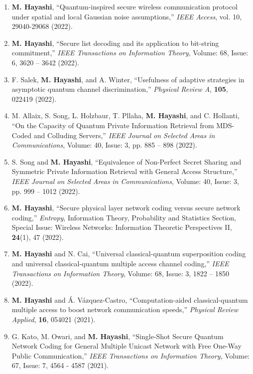 \documentclass[a4paper,12pt,oneside]{article}
\begin{document}
\begin{enumerate}
\item
\textbf{M. Hayashi},
``Quantum-inspired secure wireless communication protocol under spatial and local Gaussian noise assumptions,''
{\em IEEE Access},
vol. 10, 29040-29068 (2022).

\item
\textbf{M. Hayashi},
``Secure list decoding and its application to bit-string commitment,''
{\em IEEE Transactions on Information Theory},
Volume: 68, Issue: 6, 3620 – 3642 (2022).

\item
F. Salek, \textbf{M. Hayashi}, and A. Winter,
``Usefulness of adaptive strategies in asymptotic quantum channel discrimination,''
{\em Physical Review A},
{\bf 105}, 022419 (2022).

\item
M. Allaix, S. Song, L. Holzbaur, T. Pllaha, \textbf{M. Hayashi}, and C. Hollanti,
``On the Capacity of Quantum Private Information Retrieval from MDS-Coded and Colluding Servers,''
{\em IEEE Journal on Selected Areas in Communications},
Volume: 40, Issue: 3, pp. 885 – 898 (2022).

\item
S. Song and \textbf{M. Hayashi},
``Equivalence of Non-Perfect Secret Sharing and Symmetric Private Information Retrieval with General Access Structure,''
{\em IEEE Journal on Selected Areas in Communications},
Volume: 40, Issue: 3, pp. 999 – 1012 (2022).

\item
\textbf{M. Hayashi},
``Secure physical layer network coding versus secure network coding,''
{\em Entropy},
Information Theory, Probability and Statistics Section, Special Issue: 
Wireless Networks: Information Theoretic Perspectives II, 
{\bf 24}(1), 47 (2022).

\item
\textbf{M. Hayashi} and N. Cai,
``Universal classical-quantum superposition coding and universal classical-quantum multiple access channel coding,''
{\em IEEE Transactions on Information Theory},
Volume: 68, Issue: 3, 1822 – 1850 (2022).

\item
\textbf{M. Hayashi} and \'{A}. V\'{a}zquez-Castro,
``Computation-aided classical-quantum multiple access to boost network communication speeds,''
{\em Physical Review Applied},
{\bf 16}, 054021 (2021).

\item
G. Kato, M. Owari, and \textbf{M. Hayashi},
``Single-Shot Secure Quantum Network Coding for General Multiple Unicast Network with Free One-Way Public Communication,''
{\em IEEE Transactions on Information Theory}, 
Volume: 67, Issue: 7, 4564 - 4587 (2021).


\end{enumerate}
\end{document}
